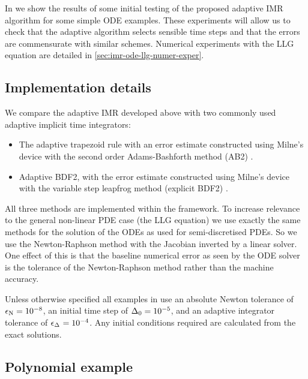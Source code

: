 
In  we show the results of some initial testing of the proposed adaptive IMR algorithm for some simple ODE examples.
These experiments will allow us to check that the adaptive algorithm selects sensible time steps and that the errors are commensurate with similar schemes.
Numerical experiments with the LLG equation are detailed in \cref{sec:imr-ode-llg-numer-exper}.


\subsection{Implementation details}
\label{sec:aimr-implementation}

We compare the adaptive IMR developed above with two commonly used adaptive implicit time integrators:
\begin{itemize}
\item The adaptive trapezoid rule with an error estimate constructed using Milne's device with the second order Adams-Bashforth method (AB2) \cite[707]{GreshoSani}.
\item Adaptive BDF2, with the error estimate constructed using Milne's device with the variable step leapfrog method (\ie explicit BDF2) \cite[715]{GreshoSani}.
\end{itemize}

All three methods are implemented within the \oomph framework.
To increase relevance to the general non-linear PDE case (\ie the LLG equation) we use exactly the same methods for the solution of the ODEs as used for semi-discretised PDEs.
So we use the Newton-Raphson method with the Jacobian inverted by a linear solver.
One effect of this is that the baseline numerical error as seen by the ODE solver is the tolerance of the Newton-Raphson method rather than the machine accuracy.

Unless otherwise specified all examples in  use an absolute Newton tolerance of $\epsilon_{\mathrm{N}} = 10^{-8}$, an initial time step of $\Delta_{0} = 10^{-5}$, and an adaptive integrator tolerance of $\epsilon_{\Delta_{}} = 10^{-4}$.
Any initial conditions required are calculated from the exact solutions.


\subsection{Polynomial example}
\label{sec:imr-polynomial-example}

